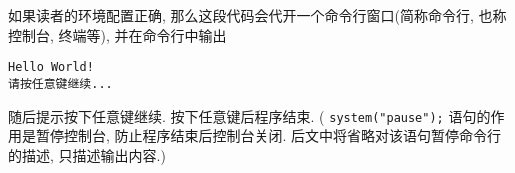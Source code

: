         如果读者的环境配置正确, 那么这段代码会代开一个命令行窗口(简称命令行, 也称控制台, 终端等), 并在命令行中输出
\begin{lstlisting}
Hello World!
请按任意键继续...
\end{lstlisting}
        随后提示按下任意键继续. 按下任意键后程序结束. ( \texttt{system("pause");} 语句的作用是暂停控制台, 防止程序结束后控制台关闭. 后文中将省略对该语句暂停命令行的描述, 只描述输出内容.)